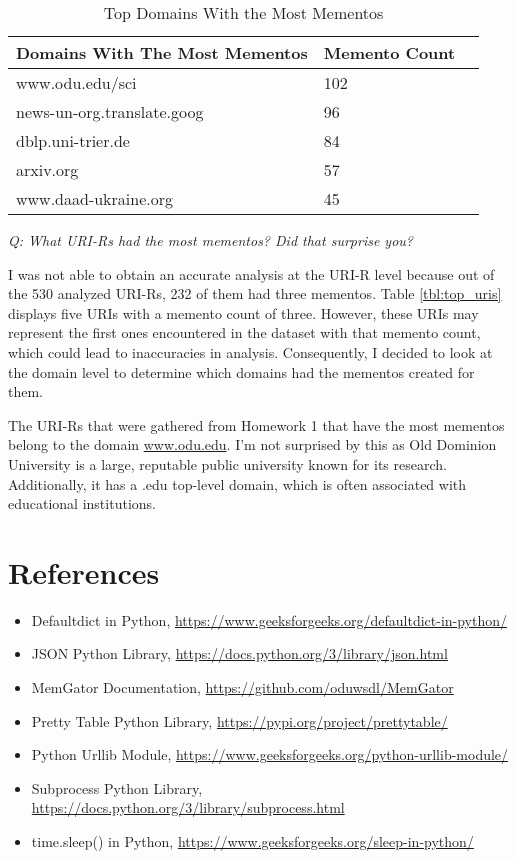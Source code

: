 \documentclass[12pt]{article}
\begin{document}
\begin{table}[h]
\centering
\caption{Top Domains With the Most Mementos}
\label{tbl:top_domains}
\begin{tabular}{|l|l|l|}
\hline
\textbf{Domains With The Most Mementos} & \textbf{Memento Count} \\ \hline \hline
www.odu.edu/sci & 102 \\ \hline
news-un-org.translate.goog & 96 \\ \hline
dblp.uni-trier.de & 84 \\ \hline
arxiv.org & 57 \\ \hline
www.daad-ukraine.org & 45 \\ \hline
\end{tabular}
\end{table}

\textit{Q: What URI-Rs had the most mementos? Did that surprise you?}

I was not able to obtain an accurate analysis at the URI-R level because out of the 530 analyzed URI-Rs, 232 of them had three mementos. Table \ref{tbl:top_uris} displays five URIs with a memento count of three. However, these URIs may represent the first ones encountered in the dataset with that memento count, which could lead to inaccuracies in analysis. Consequently, I decided to look at the domain level to determine which domains had the mementos created for them.

The URI-Rs that were gathered from Homework 1 that have the most mementos belong to the domain \url{www.odu.edu}. I'm not surprised by this as Old Dominion University is a large, reputable public university known for its research. Additionally, it has a .edu top-level domain, which is often associated with educational institutions. 

\clearpage

\section*{References}

\begin{itemize}
    \item{Defaultdict in Python, \url{https://www.geeksforgeeks.org/defaultdict-in-python/}}
    \item{JSON Python Library, \url{https://docs.python.org/3/library/json.html}}
    \item{MemGator Documentation, \url{https://github.com/oduwsdl/MemGator}}
    \item{Pretty Table Python Library, \url{https://pypi.org/project/prettytable/}}
    \item{Python Urllib Module, \url{https://www.geeksforgeeks.org/python-urllib-module/}}
    \item {Subprocess Python Library, \url{https://docs.python.org/3/library/subprocess.html}}
    \item{time.sleep() in Python, \url{https://www.geeksforgeeks.org/sleep-in-python/}}
\end{itemize}
\end{document}

